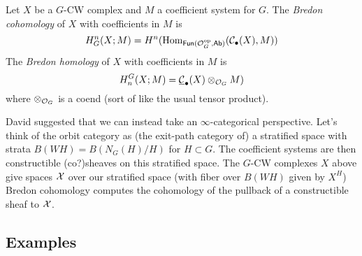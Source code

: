 \documentclass{article}
\begin{document}
\begin{dfn}
  Let $X$ be a $G$-CW complex and $M$ a coefficient system for $G$.
  The \emph{Bredon cohomology} of $X$ with coefficients in $M$ is
  \[
    H^n_G(X; M) = H^n(\operatorname{Hom}_{\mathsf{Fun}(\mathcal{O}_G^{\mathrm{op}}, \mathsf{Ab})}(\mathcal{C}_\bullet(X), M))
  \]
  The \emph{Bredon homology} of $X$ with coefficients in $M$ is
  \[
    H_n^G(X; M) = \underline{\mathcal{C}}_\bullet(X) \otimes_{\mathcal{O}_G} M)
  \]
  where $\otimes_{\mathcal{O}_G}$ is a coend (sort of like the usual tensor product).
\end{dfn}

\begin{rmk}
  David suggested that we can instead take an $\infty$-categorical perspective.
  Let's think of the orbit category as (the exit-path category of) a stratified space with strata $B(WH) = B(N_G(H)/H)$ for $H \subset G$.
  The coefficient systems are then constructible (co?)sheaves on this stratified space.
  The $G$-CW complexes $X$ above give spaces $\mathcal{X}$ over our stratified space (with fiber over $B(WH)$ given by $X^H$)
  Bredon cohomology computes the cohomology of the pullback of a constructible sheaf to $\mathcal{X}$.
\end{rmk}

\subsection{Examples}
\end{document}
